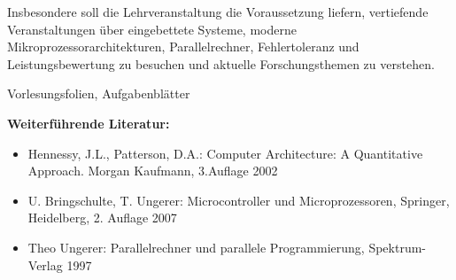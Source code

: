 \begin{course}
\begin{learningoutcomes}
Insbesondere soll die Lehrveranstaltung die Voraussetzung liefern, vertiefende Veranstaltungen über eingebettete Systeme, moderne Mikroprozessorarchitekturen, Parallelrechner, Fehlertoleranz und Leistungsbewertung zu besuchen und aktuelle Forschungsthemen zu verstehen.


\end{learningoutcomes}

\begin{content}

\end{content}

\begin{media}Vorlesungsfolien, Aufgabenblätter

\end{media}

\begin{literature}\textbf{Weiterführende Literatur:}

 \begin{itemize}\item Hennessy, J.L., Patterson, D.A.: Computer Architecture: A Quantitative Approach. Morgan Kaufmann, 3.Auflage 2002  \item U. Bringschulte, T. Ungerer: Microcontroller und Microprozessoren, Springer, Heidelberg, 2. Auflage 2007  \item Theo Ungerer: Parallelrechner und parallele Programmierung, Spektrum-Verlag 1997  \end{itemize}\end{literature}



\end{course}